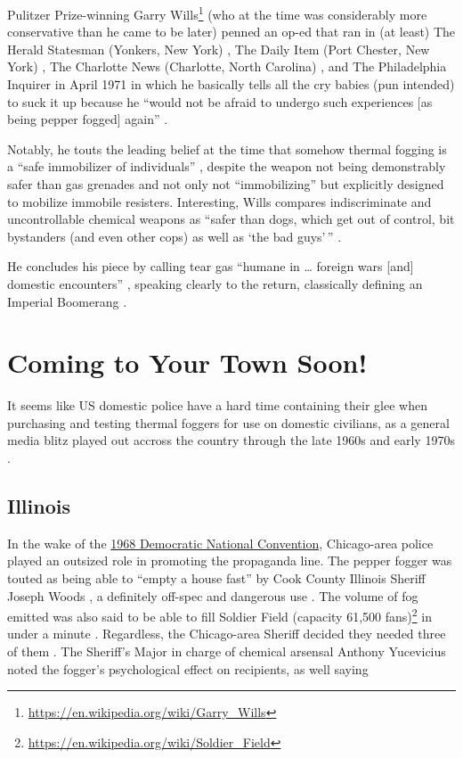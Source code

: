 \documentclass[
  11pt,
]{krantz}
\renewcommand{\href}[2]{#2\footnote{\url{#1}}}
\begin{document}
Pulitzer Prize-winning \href{https://en.wikipedia.org/wiki/Garry_Wills}{Garry Wills} (who at the time was considerably more conservative than he came to be later) penned an op-ed that ran in (at least) The Herald Statesman (Yonkers, New York) \citep{Wills1971a}, The Daily Item (Port Chester, New York) \citep{Wills1971b}, The Charlotte News (Charlotte, North Carolina) \citep{Wills1971c}, and The Philadelphia Inquirer \citep{Wills1971d} in April 1971 in which he basically tells all the cry babies (pun intended) to suck it up because he ``would not be afraid to undergo such experiences {[}as being pepper fogged{]} again'' \citep{Wills1971a}.

Notably, he touts the leading belief at the time that somehow thermal fogging is a ``safe immobilizer of individuals'' \citep{Wills1971a}, despite the weapon not being demonstrably safer than gas grenades and not only not ``immobilizing'' but explicitly designed to mobilize immobile resisters.
Interesting, Wills compares indiscriminate and uncontrollable chemical weapons as ``safer than dogs, which get out of control, bit bystanders (and even other cops) as well as `the bad guys'\,'' \citep{Wills1971a}.

He concludes his piece by calling tear gas ``humane in \ldots{} foreign wars {[}and{]} domestic encounters'' \citep{Wills1971a}, speaking clearly to the return, classically defining an Imperial Boomerang \citep{Cesaire1950, Arendt1951, Foucault1976}.

\hypertarget{coming-to-your-town-soon}{%
\section*{Coming to Your Town Soon!}\label{coming-to-your-town-soon}}


It seems like US domestic police have a hard time containing their glee when purchasing and testing thermal foggers for use on domestic civilians, as a general media blitz played out accross the country through the late 1960s and early 1970s \citep{PlainDealer1971}.

\hypertarget{illinois}{%
\subsection*{Illinois}\label{illinois}}


In the wake of the \protect\hyperlink{ChicagoIL1968_08_26}{1968 Democratic National Convention}, Chicago-area police played an outsized role in promoting the propaganda line.
The pepper fogger was touted as being able to ``empty a house fast'' by Cook County Illinois Sheriff Joseph Woods \citep{MtVernonRegisterNews1969_04_09, DailyDispatch1969_04_09}, a definitely off-spec and dangerous use \citep{Nixalite2009b}.
The volume of fog emitted was also said to be able to fill \href{https://en.wikipedia.org/wiki/Soldier_Field}{Soldier Field (capacity 61,500 fans)} in under a minute \citep{DailyDispatch1969_04_09}.
Regardless, the Chicago-area Sheriff decided they needed three of them \citep{DailyDispatch1969_04_09}.
The Sheriff's Major in charge of chemical arsensal Anthony Yucevicius noted the fogger's psychological effect on recipients, as well saying
\end{document}
